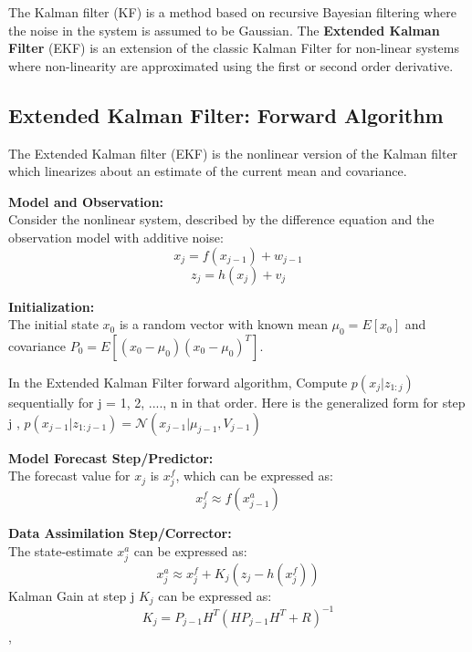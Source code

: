 \documentclass{article}
\begin{document}
The Kalman filter (KF) is a method based on recursive Bayesian filtering where the noise in the system is assumed to be Gaussian. The \textbf{Extended Kalman Filter} (EKF) is an extension of the classic Kalman Filter for non-linear systems where non-linearity are approximated using the first or second order derivative.  

\subsection{Extended Kalman Filter: Forward Algorithm}
The Extended Kalman filter (EKF) is the nonlinear version of the Kalman filter which linearizes about an estimate of the current mean and covariance. 

\textbf{Model and Observation:}\\
Consider the nonlinear system, described by the difference equation and the observation
model with additive noise:
\begin{equation}
    x_{j} = f(x_{j-1}) + w_{j-1}
\end{equation}
\begin{equation}
    z_{j} = h(x_{j}) + v_{j}
\end{equation}

\textbf{Initialization:}\\
The initial state $x_{0}$ is a random vector with known mean $\mu_{0} = E[x_{0}]$ and covariance $P_{0} = E[(x_{0} - \mu_{0})(x_{0} - \mu_{0})^{T} ]$.

In the Extended Kalman Filter forward algorithm, Compute $p(x_j | z_{1:j})$ sequentially for j = 1, 2, ...., n in that order. Here is the generalized form for step j \cite{JWMiller16}, $p(x_{j-1} | z_{1 : j-1}) = \mathcal{N}(x_{j - 1} | \mu_{j - 1}, V_{j - 1})$

\textbf{Model Forecast Step/Predictor:}\\
The forecast value for $x_{j}$ is $x_{j}^{f}$, which can be expressed as:
\begin{equation}
    x_{j}^{f} \approx f(x_{j-1}^{a})
\end{equation} 

\textbf{Data Assimilation Step/Corrector:}\\
The state-estimate $x_{j}^{a}$ can be expressed as:
\begin{equation}
    x_{j}^{a} \approx x_{j}^{f} + K_{j}(z_{j} - h(x_{j}^{f}))
\end{equation} 
Kalman Gain at step j $K_{j}$ can be expressed as:
\begin{equation}
    K_{j} = P_{j-1}H^{T}(H P_{j-1}H^{T} + R)^{-1}
\end{equation}, 
\end{document}
